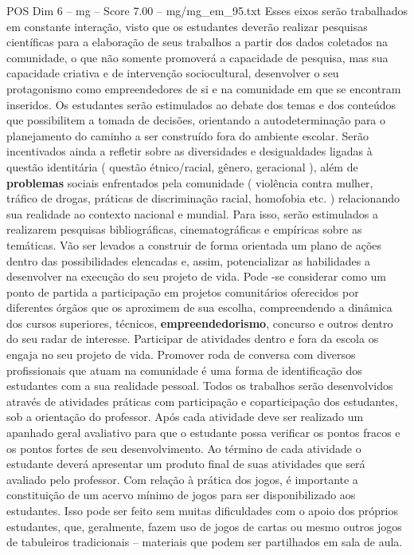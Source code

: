 \begin{textsample}{POS Dim 6 – mg – Score 7.00 – mg/mg\_em\_95.txt}
Esses eixos serão trabalhados em constante interação, visto que os estudantes deverão realizar pesquisas científicas para a elaboração de seus trabalhos a partir dos dados coletados na comunidade, o que não somente promoverá a capacidade de pesquisa, mas sua capacidade criativa e de intervenção sociocultural, desenvolver o seu protagonismo como empreendedores de si e na comunidade em que se encontram inseridos.
Os estudantes serão estimulados ao debate dos temas e dos conteúdos que possibilitem a tomada de decisões, orientando a autodeterminação para o planejamento do caminho a ser construído fora do ambiente escolar.
Serão incentivados ainda a refletir sobre as diversidades e desigualdades ligadas à questão identitária ( questão étnico/racial, gênero, geracional ), além de \textbf{problemas} sociais enfrentados pela comunidade ( violência contra mulher, tráfico de drogas, práticas de discriminação racial, homofobia etc. ) relacionando sua realidade ao contexto nacional e mundial.
Para isso, serão estimulados a realizarem pesquisas bibliográficas, cinematográficas e empíricas sobre as temáticas.
Vão ser levados a construir de forma orientada um plano de ações dentro das possibilidades elencadas e, assim, potencializar as habilidades a desenvolver na execução do seu projeto de vida.
Pode -se considerar como um ponto de partida a participação em projetos comunitários oferecidos por diferentes órgãos que os aproximem de sua escolha, compreendendo a dinâmica dos cursos superiores, técnicos, \textbf{empreendedorismo}, concurso e outros dentro do seu radar de interesse.
Participar de atividades dentro e fora da escola os engaja no seu projeto de vida.
Promover roda de conversa com diversos profissionais que atuam na comunidade é uma forma de identificação dos estudantes com a sua realidade pessoal.
Todos os trabalhos serão desenvolvidos através de atividades práticas com participação e coparticipação dos estudantes, sob a orientação do professor.
Após cada atividade deve ser realizado um apanhado geral avaliativo para que o estudante possa verificar os pontos fracos e os pontos fortes de seu desenvolvimento.
Ao término de cada atividade o estudante deverá apresentar um produto final de suas atividades que será avaliado pelo professor.
Com relação à prática dos jogos, é importante a constituição de um acervo mínimo de jogos para ser disponibilizado aos estudantes.
Isso pode ser feito sem muitas dificuldades com o apoio dos próprios estudantes, que, geralmente, fazem uso de jogos de cartas ou mesmo outros jogos de tabuleiros tradicionais – materiais que podem ser partilhados em sala de aula.

\end{textsample}
